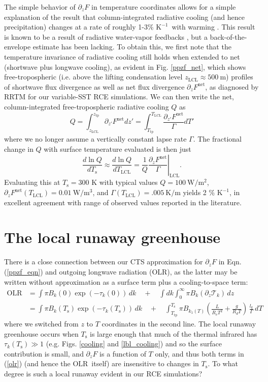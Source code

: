 \documentclass[10pt]{article}
\newcommand{\beqn}{\begin{equation}}
\newcommand{\eeqn}{\end{equation}}
\newcommand{\eqnref}[1]{(\ref{#1})}
\newcommand{\n}{\nonumber}
\newcommand{\der}[2]{\ensuremath{\frac{d #1}{d #2}}}
\newcommand{\ppz}{\ensuremath{\partial_z}}
\newcommand{\Fnet}{\ensuremath{F^\mathrm{net}}}
\newcommand{\OLR}{\ensuremath{\mathrm{OLR}}}
\newcommand{\trans}{\ensuremath{\mathcal{T}}}
\newcommand{\Ts}{\ensuremath{T_\mathrm{s}}}
\newcommand{\ztp}{\ensuremath{z_\mathrm{tp}}}
\newcommand{\zlcl}{\ensuremath{z_\mathrm{LCL}}}
\newcommand{\Tlcl}{\ensuremath{T_\mathrm{LCL}}}
\newcommand{\Ttp}{\ensuremath{T_\mathrm{tp}}}
\newcommand{\Kinverse}{\ensuremath{\mathrm{K^{-1}}}}
\begin{document}
The simple behavior of $\ppz F$ in temperature coordinates allows for a simple explanation of the result that column-integrated radiative cooling (and hence precipitation) changes at a rate of roughly 1-3\% \Kinverse\ with warming \citep{ogorman2012}. This result is known to be a result of radiative water-vapor feedbacks \citep{pendergrass2014}, but a back-of-the-envelope estimate has been lacking. To obtain this, we first note that the temperature invariance of radiative cooling still holds when extended to net (shortwave plus longwave cooling), as evident in Fig. \ref{ppzf_net}, which  shows free-tropospheric (i.e. above the lifting condensation level $\zlcl  \approx 500\ \mathrm{m}$) profiles of shortwave flux divergence  as well as net flux divergence $\ppz \Fnet$, as diagnosed by RRTM for our variable-SST RCE simulations. We can then write the net, column-integrated free-tropospheric radiative cooling $Q$ as 
	\beqn
		Q = \int_{\zlcl}^{\ztp} \partial_{z'} \Fnet dz'  = \int_{\Ttp}^{\Tlcl} \frac{\partial_{z'} \Fnet}{\Gamma} dT' \n
	\eeqn
where we no longer assume a vertically constant lapse rate $\Gamma$.  The fractional change in $Q$ with surface temperature evaluated  is then just
	\beqn
		\der{\ln Q}{\Ts}	\approx \der{\ln Q}{\Tlcl} = \frac{1}{Q} \left. \frac{\ppz \Fnet}{\Gamma}\right |_{\mathrm{LCL}}.   \n
	\eeqn
Evaluating this at $\Ts=300$ K with typical values $Q=100 \ \mathrm{W/m^2}$, $\ppz \Fnet(\Tlcl)=0.01 \ \mathrm{W/m^3}$, and $\Gamma(\Tlcl) = .005\ \mathrm{K/m}$ yields 2 \% \Kinverse, in excellent agreement with range of observed values reported in the literature. 


\section{The local runaway greenhouse} 
There is a close connection between our CTS approximation for  $\ppz F$ in Eqn. \eqnref{ppzf_eqn} and outgoing longwave radiation (OLR), as the latter may be written without approximation as a surface term plus a cooling-to-space term:
	\begin{align}
		\OLR   & = \int \pi B_k(0)\exp(-\tau_k(0))\, dk \quad + \quad \int dk \int_0^\infty \pi B_k(\partial_{z} \trans_k ) \, dz \;    \n  \\
			   &  = \int \pi  B_k(\Ts)\exp(-\tau_k(\Ts))\, dk \quad + 
			   		\quad \int_{\Ttp}^{\Ts} \pi B_{k_1(T)}\left(\frac{L }{R_vT^{2}}+\frac{g}{R_d T} \right)\, \frac{l_k}{\Gamma}\, dT  	
				   \label{olr}
	\end{align}
where we switched from $z$ to $T$ coordinates in the second line. The local runaway greenhouse \citep{pierrehumbert1995} occurs when $\Ts$ is large enough that  much of the thermal infrared has $\tau_k(\Ts) \gg 1$ (e.g. Figs. \ref{cooling} and  \ref{lbl_cooling}) and so the surface contribution is small, and $\ppz F$ is a function of $T$ only, and thus both terms in \eqnref{olr} (and hence the \OLR\ itself) are insensitive to changes in \Ts. To what degree is such a local runaway evident in our RCE simulations?
\end{document}
